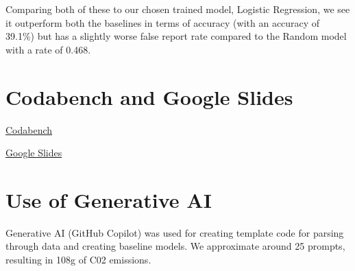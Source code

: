 \documentclass[11pt, letterpaper, notitlepage]{article}
\begin{document}
Comparing both of these to our chosen trained model, Logistic Regression, we see it outperform both the baselines in terms of accuracy (with an accuracy of 39.1\%) but has a slightly worse false report rate compared to the Random model with a rate of 0.468.

\section[4]{Codabench and Google Slides}

\href{https://www.codabench.org/competitions/6413/?secret_key=18cf17ed-e34e-4dbe-bde8-8886d5fd938f#}{Codabench}

\noindent
\href{https://docs.google.com/presentation/d/13r1v7ZJz09BcJoJHFzwneAz29XX4DrgYUD3a88opioQ/edit?usp=sharing}{Google Slides}

\section[5]{Use of Generative AI}

Generative AI (GitHub Copilot) was used for creating template code for parsing through data and creating baseline models. We approximate around 25 prompts, resulting in 108g of C02 emissions.
\end{document}
